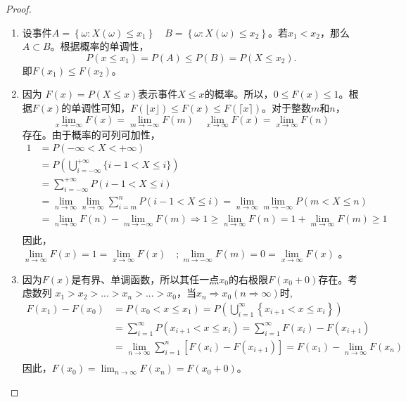 \begin{proof}
\begin{enumerate}
    \item 设事件$A =\left\{\omega: X(\omega) \leqslant x_{1}\right\} \quad B=\left\{\omega: X(\omega) \leqslant x_{2}\right\}$。若$x_1<x_2$，那么 $A \subset B$。根据概率的单调性，$$P\left(x \leqslant x_{1}\right)=P(A) \leqslant P(B)=P\left(X \leqslant x_{2}\right).$$
    即$F(x_1) \leq F(x_2) $。
    \item 因为 $F(x) = P(X \leq x) $表示事件${X \leq x}$的概率。所以，$0 \leq F(x) \leq 1$。根据$F(x)$的单调性可知，$F(\lfloor x\rfloor) \leqslant F(x) \leqslant F(\lceil x\rceil)$。对于整数$m$和$n$，
  $$ \lim _{x \rightarrow-\infty} F(x)=\lim _{m \rightarrow-\infty} F(m) \quad \lim _{x \rightarrow \infty} F(x)=\lim _{x \rightarrow \infty} F(n) $$
存在。由于概率的可列可加性，
  $$
  \begin{aligned}
1 &=P(-\infty<X<+\infty) \\
&=P\left(\bigcup_{i=-\infty}^{+\infty}\{i-1<X \leqslant i\}\right) \\
&=\sum_{i=-\infty}^{+\infty} P(i-1<X \leqslant i) \\
&=\lim _{n \rightarrow \infty} \lim _{n \rightarrow \infty} \sum_{i=m}^{n} {P(i-1<X \leqslant i)}{}=\lim _{n \rightarrow \infty} \lim _{m \rightarrow-\infty} P(m<X \leqslant n) \\
&=\lim _{n \rightarrow \infty} F(n)-\lim _{m \rightarrow-\infty} F(m) \Rightarrow 1 \geqslant \lim _{n \rightarrow \infty} F(n)=1+\lim _{m \rightarrow \infty} F(m) \geqslant 1 \\
\end{aligned}
  $$
因此，$\lim \limits_{n \rightarrow \infty} F(x)=1=\lim \limits_{x \rightarrow \infty} F(x) \quad ; \lim \limits_{m \rightarrow-\infty} F(m)=0=\lim \limits_{x \rightarrow \infty} F(x)$ 。
\item 因为$F(x)$是有界、单调函数，所以其任一点$x_0$的右极限$F(x_0 +0)$存在。考虑数列 $x_1>x_2>...>x_n>...>x_0$，当$x_n \Rightarrow x_0(n \Rightarrow \infty)$时,
$$\begin{aligned}
F\left(x_{1}\right)-F\left(x_{0}\right) &=P\left(x_{0}<x \leqslant x_{1}\right)=P\left(\bigcup_{i=1}^{\infty}\left\{x_{i+1}<x \leqslant x_{i}\right\}\right) \\
&=\sum_{i=1}^{\infty} P\left(x_{i+1}<x \leqslant x_{i}\right)=\sum_{i=1}^{\infty} F\left(x_{i}\right)-F\left(x_{i+1}\right) \\
&=\lim _{n \rightarrow \infty} \sum_{i=1}^{n}\left[F\left(x_{i}\right)-F\left(x_{i+1}\right)\right]=F\left(x_{1}\right)-\lim _{n \rightarrow \infty} F\left(x_{n}\right) \\
\end{aligned}$$
因此，$F\left(x_{0}\right) =\lim _{n \rightarrow \infty} F\left(x_{n}\right)=F\left(x_{0}+0\right)$。
\end{enumerate}
\end{proof}

